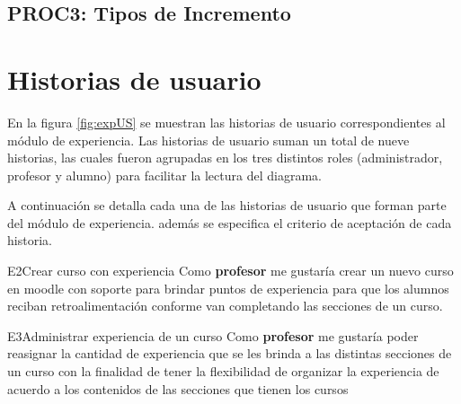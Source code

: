 \subsection{PROC3: Tipos de Incremento}

\clearpage

\section{Historias de usuario}

    En la figura \ref{fig:expUS} se muestran las historias de usuario correspondientes al módulo de experiencia. Las historias de usuario suman un total de nueve historias, las cuales fueron agrupadas en los tres distintos roles (administrador, profesor y alumno) para facilitar la lectura del diagrama.\\
    
    
    \noindent A continuación se detalla cada una de las historias de usuario que forman parte del módulo de experiencia. además se especifica el criterio de aceptación de cada historia. \clearpage
    
    \begin{UserStory}{E2}{Crear curso con experiencia}{%
        Como {\bf profesor} me gustaría crear un nuevo curso en moodle con soporte para brindar puntos de experiencia para que los alumnos reciban retroalimentación conforme van completando las secciones de un curso.
    }
        
    \end{UserStory}
    
    \begin{UserStory}{E3}{Administrar experiencia de un curso}{%
        Como {\bf profesor} me gustaría poder reasignar la cantidad de experiencia que se les brinda a las distintas secciones de un curso con la finalidad de tener la flexibilidad de organizar la experiencia de acuerdo a los contenidos de las secciones que tienen los cursos
    }
    \end{UserStory}
    
